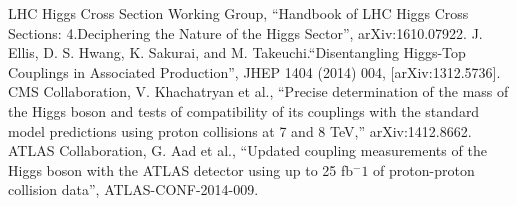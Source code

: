 \documentclass[print]{nuthesis}
\begin{document}
\begin{thebibliography}{300}
 LHC Higgs Cross Section Working Group, ``Handbook of LHC Higgs Cross Sections: 4.Deciphering the Nature of the Higgs Sector'', arXiv:1610.07922.
 J. Ellis, D. S. Hwang, K. Sakurai, and M. Takeuchi.``Disentangling Higgs-Top Couplings in Associated Production'', JHEP 1404 (2014) 004, [arXiv:1312.5736].
 CMS Collaboration, V. Khachatryan et al., ``Precise determination of the mass of the Higgs boson and tests of compatibility of its couplings with the standard model predictions using proton collisions at 7 and 8 TeV,'' arXiv:1412.8662.
 ATLAS Collaboration, G. Aad et al., ``Updated coupling measurements of the Higgs boson with the ATLAS detector using up to 25 fb$^-1$ of proton-proton collision data'', ATLAS-CONF-2014-009.




\end{thebibliography}
\end{document}
